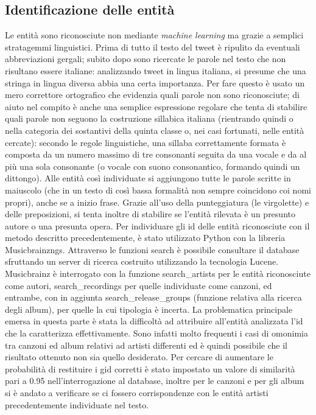 \documentclass[12pt, a4paper, twocolumn]{article} %
\begin{document}
\subsection{Identificazione delle entità}
Le entità sono riconosciute non mediante \textit{machine learning} ma grazie a semplici stratagemmi linguistici.
Prima di tutto il testo del tweet è ripulito da eventuali abbreviazioni gergali; subito dopo sono ricercate le parole nel testo che non risultano essere italiane: analizzando tweet in lingua italiana, si presume che una stringa in lingua diversa abbia una certa importanza.
Per fare questo è usato un mero correttore ortografico che evidenzia quali parole non sono riconosciute; di aiuto nel compito è anche una semplice espressione regolare che tenta di stabilire quali parole non seguono la costruzione sillabica italiana (rientrando quindi o nella categoria dei sostantivi della quinta classe o, nei casi fortunati, nelle entità cercate): secondo le regole linguistiche, una sillaba correttamente formata è composta da un numero massimo di tre consonanti seguita da una vocale e da al più una sola consonante (o vocale con suono consonantico, formando quindi un dittongo).
Alle entità così individuate si aggiungono tutte le parole scritte in maiuscolo (che in un testo di così bassa formalità non sempre coincidono coi nomi propri), anche se a inizio frase.
Grazie all'uso della punteggiatura (le virgolette) e delle preposizioni, si tenta inoltre di stabilire se l'entità rilevata è un presunto autore o una presunta opera.
Per individuare gli id delle entità riconosciute con il metodo descritto precedentemente, è stato utilizzato Python con la libreria Musicbrainzngs.
Attraverso le funzioni search è possibile consultare il database sfruttando un server di ricerca costruito utilizzando la tecnologia Lucene.
Musicbrainz è interrogato con la funzione search_artists per le entità riconosciute come autori, search_recordings per quelle individuate come canzoni, ed entrambe, con in aggiunta search_release_groups (funzione relativa alla ricerca degli album), per quelle la cui tipologia è incerta.
La problematica principale emersa in questa parte è stata la difficoltà ad attribuire all’entità analizzata l’id che la caratterizza effettivamente.
Sono infatti molto frequenti i casi di omonimia tra canzoni ed album relativi ad artisti differenti ed è quindi possibile che il risultato ottenuto non sia quello desiderato.
Per cercare di aumentare le probabilità di restituire i gid corretti è stato impostato un valore di similarità pari a 0.95 nell’interrogazione al database, inoltre per le canzoni e per gli album si è andato a verificare se ci fossero corrispondenze con le entità artisti precedentemente individuate nel testo.
\end{document}
